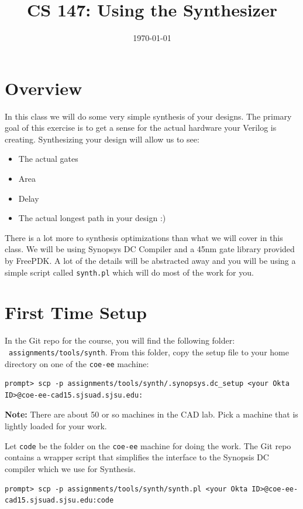 \documentclass[11pt]{article}
\title{CS 147: Using the Synthesizer}
\author{}
\date{\today}
\begin{document}
\maketitle
\section{Overview}
In this class we will do some very simple synthesis of your designs. The primary goal of this exercise is to get a sense for the actual hardware your Verilog is creating. Synthesizing your design will allow us to see:
\begin{itemize}
\item
The actual gates
\item
Area
\item
Delay
\item
The actual longest path in your design :)
\end{itemize}
There is a lot more to synthesis optimizations than what we will cover in this class.
We will be using Synopsys DC Compiler and a 45nm gate library provided by FreePDK. A lot of the details will be abstracted away and you will be using a simple script called \texttt{synth.pl} which will do most of the work for you.

\section{First Time Setup}
In the Git repo for the course, you will find the following folder: \ \texttt{assignments/tools/synth}.  From this folder, copy
the setup file to your home directory on one of the \texttt{coe-ee} machine:
\begin{scriptsize}
\begin{verbatim}
prompt> scp -p assignments/tools/synth/.synopsys.dc_setup <your Okta ID>@coe-ee-cad15.sjsuad.sjsu.edu:
\end{verbatim}
\end{scriptsize}

\textbf{Note:} There are about 50 or so machines in the CAD lab.  Pick a machine that is lightly loaded for your work.

Let \texttt{code} be the folder on the \texttt{coe-ee} machine for doing the work. The Git repo contains a
wrapper script that simplifies the interface to the Synopsis DC compiler which we use for Synthesis.

\begin{scriptsize}
\begin{verbatim}
prompt> scp -p assignments/tools/synth/synth.pl <your Okta ID>@coe-ee-cad15.sjsuad.sjsu.edu:code
\end{verbatim}
\end{scriptsize}
\end{document}
